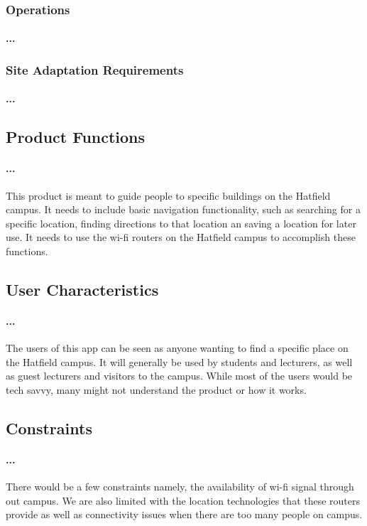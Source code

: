 \documentclass[runningheads,a4paper]{article}
\begin{document}
\subsubsection{Operations}
\paragraph{...}
\subsubsection{Site Adaptation Requirements}
\paragraph{...}

\subsection{Product Functions}
\paragraph{...}
This product is meant to guide people to specific buildings on the Hatfield campus. It needs to include basic navigation functionality, such as searching for a specific location, finding directions to that location an saving a location for later use. It needs to use the wi-fi routers on the Hatfield campus to accomplish these functions.
\subsection{User Characteristics}
\paragraph{...}
The users of this app can be seen as anyone wanting to find a specific place on the Hatfield campus. It will generally be used by students and lecturers, as well as guest lecturers and visitors to the campus. While most of the users would be tech savvy, many might not understand the product or how it works.
\subsection{Constraints}
\paragraph{...}
There would be a few constraints namely, the availability of wi-fi signal through out campus. We are also limited with the location technologies that these routers provide as well as connectivity issues when there are too many people on campus.
\end{document}
